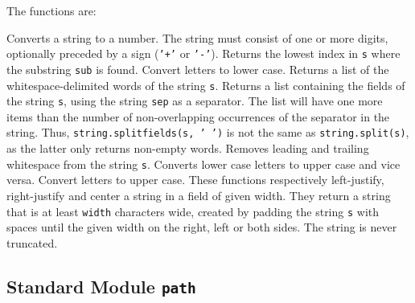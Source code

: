 The functions are:
\begin{description}
Converts a string to a number.
The string must consist of one or more digits, optionally preceded by a
sign ({\tt '+'} or {\tt '-'}).
Returns the lowest index in
{\tt s}
where the substring
{\tt sub}
is found.
Convert letters to lower case.
Returns a list of the whitespace-delimited words of the string
{\tt s}.
Returns a list containing the fields of the string
{\tt s},
using the string
{\tt sep}
as a separator.
The list will have one more items than the number of non-overlapping
occurrences of the separator in the string.
Thus,
{\tt string.splitfields(s, ' ')}
is not the same as
{\tt string.split(s)},
as the latter only returns non-empty words.
Removes leading and trailing whitespace from the string
{\tt s}.
Converts lower case letters to upper case and vice versa.
Convert letters to upper case.
These functions respectively left-justify, right-justify and center a
string in a field of given width.
They return a string that is at least
{\tt width}
characters wide, created by padding the string
{\tt s}
with spaces until the given width on the right, left or both sides.
The string is never truncated.
\end{description}

\subsection{Standard Module {\tt path}}

